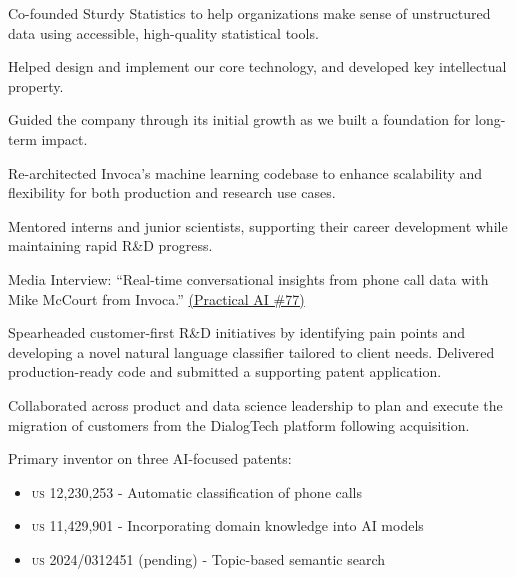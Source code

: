 
\begin{innerlist}
\item Co-founded Sturdy Statistics to help organizations make sense of unstructured data using accessible, high-quality statistical tools.
\item Helped design and implement our core technology, and developed key intellectual property.
\item Guided the company through its initial growth as we built a foundation for long-term impact.
\end{innerlist}





\begin{innerlist}
\item Re-architected Invoca's machine learning codebase to enhance scalability and flexibility for both production and research use cases.
\item Mentored interns and junior scientists, supporting their career development while maintaining rapid R\&D progress.
\item Media Interview: ``Real-time conversational insights from phone call data with Mike McCourt from Invoca.'' \href{https://practicalai.fm/77}{(Practical AI \#77)}
\end{innerlist}



\begin{innerlist}
\item Spearheaded customer-first R\&D initiatives by identifying pain points and developing a novel natural language classifier tailored to client needs. Delivered production-ready code and submitted a supporting patent application.
\item Collaborated across product and data science leadership to plan and execute the migration of customers from the DialogTech platform following acquisition.
\item Primary inventor on three AI-focused patents:
  \begin{itemize}
    \item \textsc{\MakeTextLowercase{US 12,230,253}} - Automatic classification of phone calls
    \item \textsc{\MakeTextLowercase{US 11,429,901}} - Incorporating domain knowledge into AI models
    \item \textsc{\MakeTextLowercase{US 2024/0312451}} (pending) - Topic-based semantic search
  \end{itemize}
\end{innerlist}


